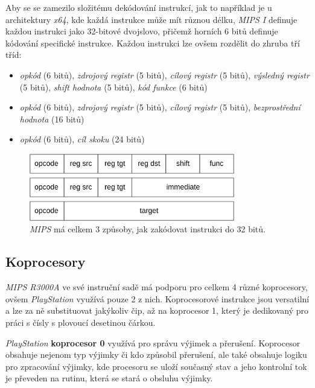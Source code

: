 Aby se se zamezilo složitému dekódování instrukcí, jak to například je u architektury \textit{x64}, kde každá instrukce
může mít různou délku, \textit{MIPS I} definuje každou instrukci jako 32-bitové dvojslovo, přičemž horních 6 bitů definuje
kódování specifické instrukce. Každou instrukci lze ovšem rozdělit do zhruba tří tříd:

\begin{itemize}
    \item{\textit{opkód} (6 bitů), \textit{zdrojový registr} (5 bitů), \textit{cílový registr} (5 bitů), \textit{výsledný registr} (5 bitů), \textit{shift hodnota} (5 bitů), \textit{kód funkce} (6 bitů)}
    \item{\textit{opkód} (6 bitů), \textit{zdrojový registr} (5 bitů), \textit{cílový registr} (5 bitů), \textit{bezprostřední hodnota} (16 bitů)}
    \item{\textit{opkód} (6 bitů), \textit{cíl skoku} (24 bitů)}
\end{itemize}


\begin{figure}[hbt]
	\centering
	\includegraphics[width=0.8\textwidth]{obrazky-figures/instruction.png}
	\caption{\textit{MIPS} má celkem 3 způsoby, jak zakódovat instrukci do 32 bitů.}
	\label{instruction}
\end{figure}

\subsection{Koprocesory}

\textit{MIPS R3000A} ve své instruční sadě má podporu pro celkem 4 různé koprocesory, ovšem \textit{PlayStation} využívá
pouze 2 z nich. Koprocesorové instrukce jsou versatilní a lze za ně substituovat jakýkoliv čip, až na koprocesor 1, který
je dedikovaný pro práci s čísly s plovoucí desetinou čárkou.

\textit{PlayStation} \textbf{koprocesor 0} využívá pro správu výjimek a přerušení. Koprocesor obsahuje nejenom typ výjimky či kdo
způsobil přerušení, ale také obsahuje logiku pro zpracování výjimky, kde procesoru se uloží současný stav a jeho kontrolní tok je převeden
na rutinu, která se stará o obsluhu výjimky.

